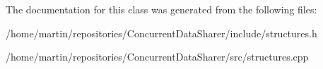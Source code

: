 The documentation for this class was generated from the following files\+:\begin{DoxyCompactItemize}
\item 
/home/martin/repositories/\+Concurrent\+Data\+Sharer/include/structures.\+h\item 
/home/martin/repositories/\+Concurrent\+Data\+Sharer/src/structures.\+cpp\end{DoxyCompactItemize}
